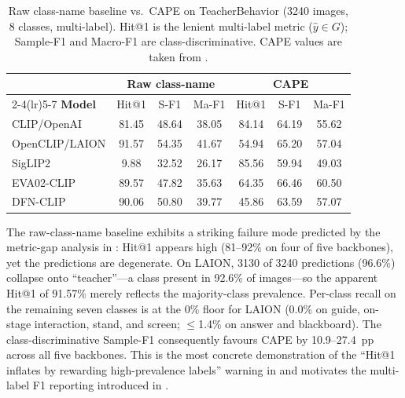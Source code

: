 \documentclass[symmetry,article,submit,pdftex,moreauthors]{Definitions/mdpi}
\begin{document}
\begin{table}[H]
\caption{Raw class-name baseline vs.\ CAPE on TeacherBehavior (3240 images, 8 classes, multi-label). Hit@1 is the lenient multi-label metric ($\hat{y}\in G$); Sample-F1 and Macro-F1 are class-discriminative. CAPE values are taken from .}
\label{tab:raw_label_e14}
\centering
\small
\setlength{\tabcolsep}{4pt}
\begin{tabular}{l ccc ccc}
\toprule
 & \multicolumn{3}{c}{\textbf{Raw class-name}} & \multicolumn{3}{c}{\textbf{CAPE}} \\
\cmidrule(lr){2-4}\cmidrule(lr){5-7}
\textbf{Model} & Hit@1 & S-F1 & Ma-F1 & Hit@1 & S-F1 & Ma-F1 \\
\midrule
CLIP/OpenAI       & 81.45 & 48.64 & 38.05 & 84.14 & 64.19 & 55.62 \\
OpenCLIP/LAION    & 91.57 & 54.35 & 41.67 & 54.94 & 65.20 & 57.04 \\
SigLIP2           &  9.88 & 32.52 & 26.17 & 85.56 & 59.94 & 49.03 \\
EVA02-CLIP        & 89.57 & 47.82 & 35.63 & 64.35 & 66.46 & 60.50 \\
DFN-CLIP          & 90.06 & 50.80 & 39.77 & 45.86 & 63.59 & 57.07 \\
\bottomrule
\end{tabular}
\end{table}

The raw-class-name baseline exhibits a striking failure mode predicted by the metric-gap analysis in : Hit@1 appears high (81--92\% on four of five backbones), yet the predictions are degenerate. On LAION, 3130 of 3240 predictions (96.6\%) collapse onto ``teacher''---a class present in 92.6\% of images---so the apparent Hit@1 of 91.57\% merely reflects the majority-class prevalence. Per-class recall on the remaining seven classes is at the 0\% floor for LAION (0.0\% on guide, on-stage interaction, stand, and screen; $\leq$1.4\% on answer and blackboard). The class-discriminative Sample-F1 consequently favours CAPE by 10.9--27.4~pp across all five backbones. This is the most concrete demonstration of the ``Hit@1 inflates by rewarding high-prevalence labels'' warning in  and motivates the multi-label F1 reporting introduced in .
\end{document}
